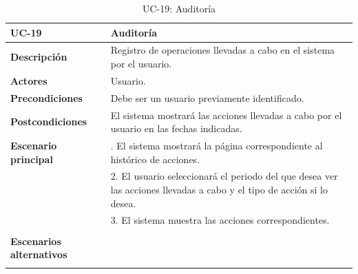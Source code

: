 \begin{table}
  \begin{center}
    \begin{tabularx}{16.4cm}{|l|X|}
      \hline
      \textbf{UC-19} & \textbf{Auditoría}\\
      \hline
      \textbf{Descripción} & Registro de operaciones llevadas a cabo en el sistema por el usuario.\\
      \hline
      \textbf{Actores} & Usuario.\\
      \hline
      \textbf{Precondiciones} & Debe ser un usuario previamente identificado.\\
      \hline
      \textbf{Postcondiciones} & El sistema mostrará las acciones llevadas a cabo por el usuario en las fechas indicadas.\\
      \hline
      \textbf{Escenario principal} & \smallskip 1. El sistema mostrará la página correspondiente al histórico de acciones.\\
      & 2. El usuario seleccionará el periodo del que desea ver las acciones llevadas a cabo y el tipo de acción si lo desea.\\
      & 3. El sistema muestra las acciones correspondientes.\\
      & \\
      \hline
      \textbf{Escenarios alternativos} & \\
      & \\
      \hline
    \end{tabularx}
    \caption{UC-19: Auditoría}
    \label{tab:CU-auditorias}
  \end{center}
\end{table}


